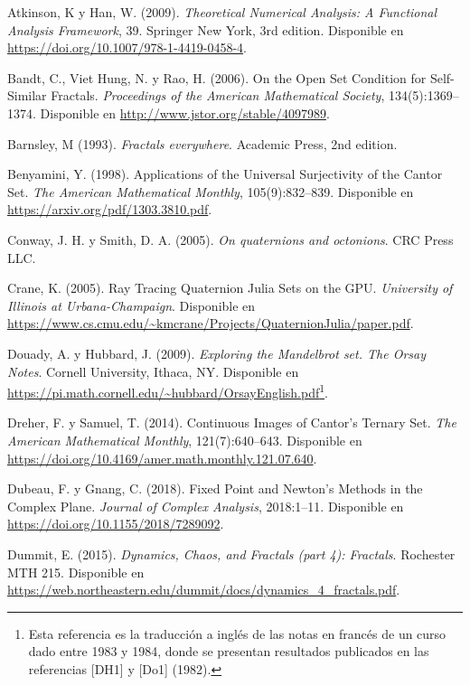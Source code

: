 
\begin{thebibliography}{99}

     Atkinson, K y Han, W. (2009). \textit{Theoretical Numerical Analysis: A Functional Analysis Framework}, 39. Springer New York, 3rd edition. Disponible en \url{https://doi.org/10.1007/978-1-4419-0458-4}.

     Bandt, C., Viet Hung, N. y Rao, H. (2006). On the Open Set Condition for Self-Similar Fractals. \textit{Proceedings of the American Mathematical Society}, 134(5):1369--1374. Disponible en \url{http://www.jstor.org/stable/4097989}.

     Barnsley, M (1993). \textit{Fractals everywhere}. Academic Press, 2nd edition.

     Benyamini, Y. (1998). Applications of the Universal Surjectivity of the Cantor Set. \textit{The American Mathematical Monthly}, 105(9):832--839. Disponible en \url{https://arxiv.org/pdf/1303.3810.pdf}.

     Conway, J. H. y Smith, D. A. (2005). \textit{On quaternions and octonions}. CRC Press LLC.

     Crane, K. (2005). Ray Tracing Quaternion Julia Sets on the GPU. \textit{University of Illinois at Urbana-Champaign}. Disponible en \url{https://www.cs.cmu.edu/~kmcrane/Projects/QuaternionJulia/paper.pdf}.

     Douady, A. y Hubbard, J. (2009). \textit{Exploring the Mandelbrot set. The Orsay Notes}. Cornell University, Ithaca, NY. Disponible en \url{https://pi.math.cornell.edu/~hubbard/OrsayEnglish.pdf}\footnote{Esta referencia es la traducción a inglés de las notas en francés de un curso dado entre 1983 y 1984, donde se presentan resultados publicados en las referencias [DH1] y [Do1] (1982).}.

     Dreher, F. y Samuel, T. (2014). Continuous Images of Cantor’s Ternary Set. \textit{The American Mathematical Monthly}, 121(7):640--643. Disponible en \url{https://doi.org/10.4169/amer.math.monthly.121.07.640}.

     Dubeau, F. y Gnang, C. (2018). Fixed Point and Newton’s Methods in the Complex Plane. \textit{Journal of Complex Analysis}, 2018:1--11. Disponible en \url{https://doi.org/10.1155/2018/7289092}.

     Dummit, E. (2015). \textit{Dynamics, Chaos, and Fractals (part 4): Fractals}. Rochester MTH 215. Disponible en \url{https://web.northeastern.edu/dummit/docs/dynamics_4_fractals.pdf}.


\end{thebibliography}
